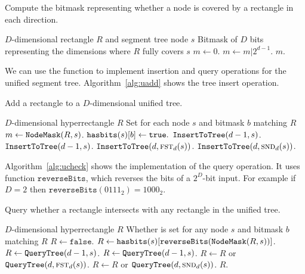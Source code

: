 \documentclass[english,gradu]{tktltiki2018}
\begin{document}
\begin{algorithm}
\caption{Compute the bitmask representing whether a node is covered by a rectangle in each direction.}\label{alg:maskof}
\begin{algorithmic}
\Require $D$-dimensional rectangle $R$ and segment tree node $s$
\Ensure Bitmask of $D$ bits representing the dimensions where $R$ fully covers $s$
	\State $m\gets 0$.
			\State $m\gets m | 2^{d-1}$.
		\EndIf
	\EndFor
	\State \Return $m$.
\EndProcedure
\end{algorithmic}
\end{algorithm}

We can use the \maskoff function to implement insertion and query operations for the unified segment tree.
Algorithm~\ref{alg:uadd} shows the tree insert operation.

\begin{algorithm}
\caption{Add a rectangle to a $D$-dimensional unified tree.}\label{alg:uadd}
\begin{algorithmic}
\Require $D$-dimensional hyperrectangle $R$
\Ensure Set  for each node $s$ and bitmask $b$ matching $R$
		\State $m\gets\texttt{NodeMask}(R,s)$.
				\State $\texttt{hasbits}(s)[b]\gets\texttt{true}.$
			\EndIf
		\EndFor
		\State $\texttt{InsertToTree}(d-1,s)$.
		\State $\texttt{InsertToTree}(d-1,s)$.
		\State $\texttt{InsertToTree}(d,\textsc{fst}_{d}(s))$.
		\State $\texttt{InsertToTree}(d,\textsc{snd}_{d}(s))$.
	\EndIf
\EndProcedure
\end{algorithmic}
\end{algorithm}

Algorithm~\ref{alg:ucheck} shows the implementation of the query operation.
It uses function $\texttt{reverseBits}$, which reverses the bits of a $2^D$-bit input.
For example if $D=2$ then $\texttt{reverseBits}(0111_2)=1000_2$.

\begin{algorithm}
\caption{Query whether a rectangle intersects with any rectangle in the unified tree.}\label{alg:ucheck}
\begin{algorithmic}
\Require $D$-dimensional hyperrectangle $R$
\Ensure Whether  is set for any node $s$ and bitmask $b$ matching $R$
	\State $R\gets\texttt{false}$.
		\State $R\gets\texttt{hasbits}(s)[\texttt{reverseBits}(\texttt{NodeMask}(R,s))]$.
		\State $R\gets\texttt{QueryTree}(d-1,s)$.
		\State $R\gets\texttt{QueryTree}(d-1,s)$.
		\State $R\gets R$ or $\texttt{QueryTree}(d,\textsc{fst}_{d}(s))$.
		\State $R\gets R$ or $\texttt{QueryTree}(d,\textsc{snd}_{d}(s))$.
	\EndIf
	\State \Return $R$.
\EndProcedure
\end{algorithmic}
\end{algorithm}
\end{document}
